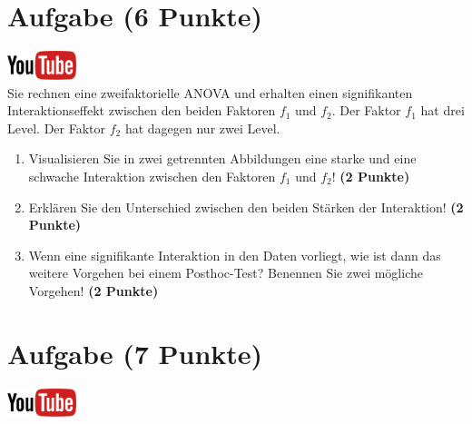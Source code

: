 \documentclass[a4paper, 10pt]{scrartcl}\usepackage[]{graphicx}\usepackage[]{xcolor}
\begin{document}
 
\clearpage

\section{Aufgabe \hfill (6 Punkte)}

\hfill\href{https://youtu.be/2qG1Dws0MJo}{\includegraphics[width =
  2cm]{img/youtube}}\\[1Ex]


Sie rechnen eine zweifaktorielle ANOVA und erhalten einen signifikanten
Interaktionseffekt zwischen den beiden Faktoren $f_1$ und $f_2$. Der Faktor
$f_1$ hat drei Level. Der Faktor $f_2$ hat dagegen nur zwei Level.




\begin{enumerate}
\item Visualisieren Sie in zwei getrennten Abbildungen 
  eine starke und eine schwache Interaktion zwischen
  den Faktoren $f_1$ und $f_2$! \textbf{(2 Punkte)}
\item Erkl{\"a}ren Sie den Unterschied zwischen den beiden St{\"a}rken der Interaktion!
  \textbf{(2 Punkte)}
\item Wenn eine signifikante Interaktion in den Daten vorliegt, wie ist
  dann das weitere Vorgehen bei einem Posthoc-Test? Benennen Sie zwei
  m{\"o}gliche Vorgehen!
  \textbf{(2 Punkte)}
\end{enumerate}

 
\clearpage

\section{Aufgabe \hfill (7 Punkte)}

\hfill\href{https://youtu.be/M9Uhm67ndxM}{\includegraphics[width =
  2cm]{img/youtube}}\\[1Ex]
\end{document}
